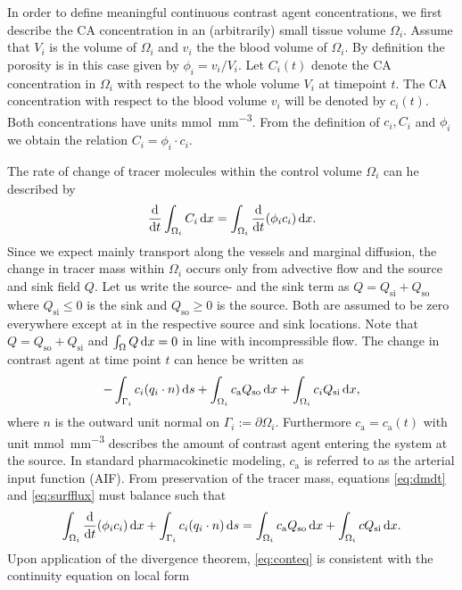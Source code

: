 \documentclass[paper=a4, fontsize=11pt,parskip=half,headings=small]{scrartcl}
\newcommand{\Qso}{Q_{\mathrm{so}}}
\newcommand{\Qsi}{Q_{\mathrm{si}}}
\newcommand{\ca}{c_\mathrm{a}}
\newcommand{\sic}{\milli\mol\per\cubic\milli\meter}
\begin{document}
	In order to define meaningful continuous contrast agent concentrations, we first describe the CA concentration in an (arbitrarily) small tissue volume $\Omega_i$.
	Assume that $V_i$ is the volume of $\Omega_i$ and $v_i$ the the blood volume of $\Omega_i$.
	By definition the porosity is in this case given by $\phi_i = v_i/V_i$.
	Let $C_i(t)$ denote the CA concentration in $\Omega_i$ with respect to the whole volume $V_i$ at timepoint $t$.
	The CA concentration with respect to the blood volume $v_i$ will be denoted by $c_i(t)$.
	Both concentrations have units \si{\sic}. 
	From the definition of $c_i,C_i$ and $\phi_i$ we obtain the relation $C_i = \phi_i \cdot c_i$.

	The rate of change of tracer molecules within the control volume $\Omega_i$ can he described by
	\begin{equation}
		\frac{\mathrm{d}}{\mathrm{d} t}\int_{\Omega_i}C_i \,\mathrm{d} x = \int_{\Omega_i}\frac{\mathrm{d}}{\mathrm{d} t}(\phi_i c_i) \,\mathrm{d} x.
		\label{eq:dmdt}
	\end{equation}	
	Since we expect mainly transport along the vessels and marginal diffusion, the change in tracer mass within $\Omega_i$ occurs only from advective flow and the source and sink field $Q$.
	Let us write the source- and the sink term as $Q = \Qsi + \Qso$ where $\Qsi \le 0$ is the sink and $\Qso \ge 0$ is the source. 
	Both are assumed to be zero everywhere except at in the respective source and sink locations.
	Note that $Q = \Qso + \Qsi$ and $\int_\Omega Q \,\mathrm{d} x = 0$ in line with incompressible flow. 
	The change in contrast agent at time point $t$ can hence be written as
	\begin{equation}
		-\int_{ \Gamma_i}c_i(q_i \cdot n)\diffint s + \int_{\Omega_i}\ca \Qso \diffint x + \int_{\Omega_i}c_i\Qsi \diffint x,
		\label{eq:surfflux}
	\end{equation}
	where $n$ is the outward unit normal on $\Gamma_i := \partial \Omega_i$.
	Furthermore $\ca = \ca(t)$ with unit \si{\sic} describes the amount of contrast agent entering the system at the source. 
	In standard pharmacokinetic modeling, $\ca$ is referred to as the arterial input function (AIF).
	From preservation of the tracer mass, equations \eqref{eq:dmdt} and \eqref{eq:surfflux} must balance such that
	\begin{equation}
		\int_{\Omega_i}\diffop{t} (\phi_i c_i) \diffint x + \int_{ \Gamma_i}c_i(q_i \cdot n) \diffint s = \int_{\Omega_i}\ca\Qso \diffint x + \int_{\Omega_i}c \Qsi \diffint x.
		\label{eq:conteq}
	\end{equation}
	Upon application of the divergence theorem, \eqref{eq:conteq} is consistent with the continuity equation on local form
\end{document}
